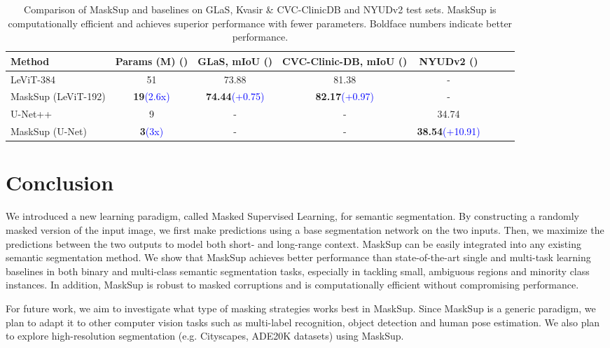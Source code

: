 \documentclass{bmvc2k}
\begin{document}
\begin{table}[!htb]
\caption{Comparison of MaskSup and baselines on GLaS, Kvasir \& CVC-ClinicDB and NYUDv2 test sets. MaskSup is computationally efficient and achieves superior performance with fewer parameters. Boldface numbers indicate better performance.}
\small
\setlength{\tabcolsep}{2.2pt}
\medskip
\centering
\begin{tabular}{l*{7}{c}}
\toprule
\textbf{Method} & Params (M) () & GLaS, mIoU () & CVC-Clinic-DB, mIoU () & NYUDv2 () \\
\midrule
LeViT-384~\cite{xu2021levit} & 51 & 73.88 & 81.38 & - \\
MaskSup (LeViT-192)  & \textbf{19}\textcolor{blue}{(2.6x)} & \textbf{74.44}\textcolor{blue}{(+0.75)} & \textbf{82.17}\textcolor{blue}{(+0.97)} & - \\
\midrule
U-Net++~\cite{zhou2019unet++} & 9 & - & - & 34.74 \\
MaskSup (U-Net) & \textbf{3}\textcolor{blue}{(3x)} & - & - & \textbf{38.54}\textcolor{blue}{(+10.91)}\\
\bottomrule
\end{tabular}
\label{Tab:scale}
\end{table}

\section{Conclusion}
We introduced a new learning paradigm, called Masked Supervised Learning, for semantic segmentation. By constructing a randomly masked version of the input image, we first make predictions using a base segmentation network on the two inputs. Then, we maximize the predictions between the two outputs to model both short- and long-range context. MaskSup can be easily integrated into any existing semantic segmentation method. We show that MaskSup achieves better performance than state-of-the-art single and multi-task learning baselines in both binary and multi-class semantic segmentation tasks, especially in tackling small, ambiguous regions and minority class instances. In addition, MaskSup is robust to masked corruptions and is computationally efficient without compromising performance.

For future work, we aim to investigate what type of masking strategies works best in MaskSup. Since MaskSup is a generic paradigm, we plan to adapt it to other computer vision tasks such as multi-label recognition, object detection and human pose estimation. We also plan to explore high-resolution segmentation (e.g. Cityscapes, ADE20K datasets) using MaskSup.


\end{document}
